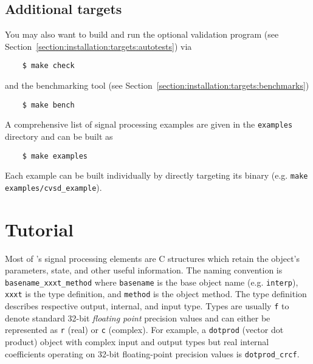 \subsection{Additional targets}
\label{section:quickstart:additional_targets}
%
You may also want to build and run the optional validation program
(see Section~\ref{section:installation:targets:autotests}) via
\begin{verbatim}
    $ make check
\end{verbatim}
and the benchmarking tool
(see Section~\ref{section:installation:targets:benchmarks})
\begin{verbatim}
    $ make bench
\end{verbatim}
%
A comprehensive list of signal processing examples are given in the
{\tt examples} directory and can be built as
\begin{verbatim}
    $ make examples
\end{verbatim}
%
Each example can be built individually by directly targeting its binary
(e.g. {\tt make examples/cvsd\_example}).

\section{Tutorial}
\label{section:tutorial}
Most of \liquid's signal processing elements are C structures which
retain the object's parameters, state, and other useful information.
The naming convention is
{\tt basename\_xxxt\_method} where
{\tt basename} is the base object name (e.g. {\tt interp}),
{\tt xxxt} is the type definition, and
{\tt method} is the object method.
The type definition describes respective output, internal, and input type.
Types are usually {\tt f} to denote standard 32-bit {\it floating point}
precision values and can either be represented as {\tt r} (real) or {\tt c}
(complex).
For example, a {\tt dotprod} (vector dot product) object with complex input
and output types but real internal coefficients operating on 32-bit
floating-point precision values is {\tt dotprod\_crcf}.


